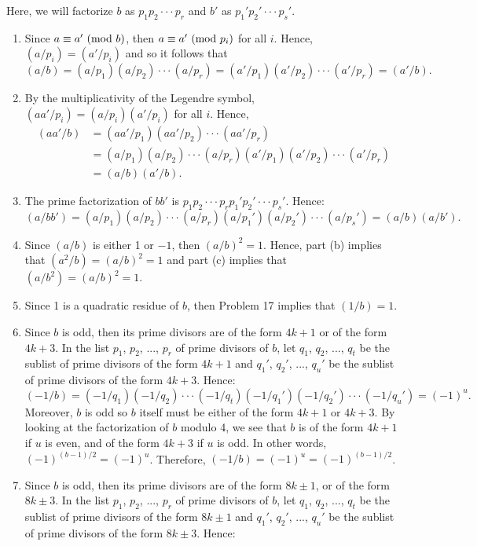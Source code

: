 \begin{solution}
    Here, we will factorize $b$ as $p_1p_2 \cdot \cdot \cdot p_r$ and $b'$ as $p_1'p_2' \cdot \cdot \cdot p_s'$.
    \begin{enumerate}
        \item Since $a \equiv a' \ (\mathrm{mod}\ b)$, then $a \equiv a' \ (\mathrm{mod}\ p_i)$ for all $i$. Hence, $(a/p_i) = (a'/p_i)$ and so it follows that
        $$(a/b) = (a/p_1)(a/p_2) \cdot \cdot \cdot (a/p_r) = (a'/p_1)(a'/p_2) \cdot \cdot \cdot (a'/p_r) = (a'/b).$$
        \item By the multiplicativity of the Legendre symbol, $(aa'/p_i) = (a/p_i)(a'/p_i)$ for all $i$. Hence,
        \begin{align*}
            (aa'/b) &= (aa'/p_1)(aa'/p_2) \cdot \cdot \cdot (aa'/p_r) \\
            &= (a/p_1)(a/p_2) \cdot \cdot \cdot (a/p_r)(a'/p_1)(a'/p_2) \cdot \cdot \cdot (a'/p_r) \\
            &= (a/b)(a'/b).
        \end{align*}
        \item The prime factorization of $bb'$ is $p_1p_2\cdot \cdot \cdot p_rp_1'p_2' \cdot\cdot \cdot p_s'$. Hence:
        $$(a/bb') = (a/p_1)(a/p_2) \cdot \cdot \cdot (a/p_r)(a/p_1')(a/p_2') \cdot \cdot \cdot (a/p_s') = (a/b)(a/b').$$
        \item Since $(a/b)$ is either 1 or $-1$, then $(a/b)^2 = 1$. Hence, part (b) implies that $(a^2/b) = (a/b)^2 = 1$ and part (c) implies that $(a/b^2) = (a/b)^2 = 1$.
        \item Since 1 is a quadratic residue of $b$, then Problem 17 implies that $(1/b) = 1$.
        \item Since $b$ is odd, then its prime divisors are of the form $4k+1$ or of the form $4k + 3$. In the list $p_1$, $p_2$, ..., $p_r$ of prime divisors of $b$, let $q_1$, $q_2$, ..., $q_t$ be the sublist of prime divisors of the form $4k+1$ and $q_1'$, $q_2'$, ..., $q_u'$ be the sublist of prime divisors of the form $4k+3$. Hence:
        $$(-1/b) = (-1/q_1)(-1/q_2)\cdot \cdot \cdot (-1/q_t)(-1/q_1')(-1/q_2')\cdot \cdot \cdot (-1/q_u') = (-1)^u.$$
        Moreover, $b$ is odd so $b$ itself must be either of the form $4k+1$ or $4k+3$. By looking at the factorization of $b$ modulo 4, we see that $b$ is of the form $4k+1$ if $u$ is even, and of the form $4k+3$ if $u$ is odd. In other words, $(-1)^{(b-1)/2} = (-1)^u$. Therefore, $(-1/b) = (-1)^{u} = (-1)^{(b-1)/2}$.
        \item Since $b$ is odd, then its prime divisors are of the form $8k\pm 1$, or of the form $8k \pm 3$. In the list $p_1$, $p_2$, ..., $p_r$ of prime divisors of $b$, let $q_1$, $q_2$, ..., $q_t$ be the sublist of prime divisors of the form $8k \pm 1$ and $q_1'$, $q_2'$, ..., $q_u'$ be the sublist of prime divisors of the form $8k\pm 3$. Hence:

\end{enumerate}
\end{solution}
